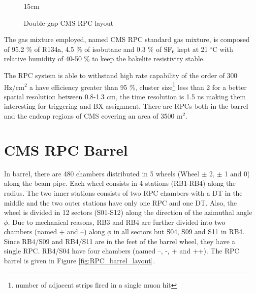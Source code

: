 \begin{figure}[!htm]{15cm} %
\caption{Double-gap CMS RPC layout}%
\label{fig:RPClayout}
\end{figure}

The gas mixture employed, named CMS RPC standard gas mixture, is composed of 95.2 \% of R134a, 4.5 \% of isobutane and 0.3 \% of SF$_6$ kept at 21 $^\circ$C with relative humidity of 40-50 \% to keep the bakelite resistivity stable. 

The RPC system is able to withstand high rate capability of the order of 300 Hz/cm$^2$ a have efficiency greater than 95 \%, cluster size\footnote{number of adjacent strips fired in a single muon hit} less than 2 for a better spatial resolution between 0.8-1.3 cm, the time resolution is 1.5 ns making them interesting for triggering and BX assignment. There are RPCs both in the barrel and the endcap regions of CMS covering an area of 3500 m$^2$. 

\section{CMS RPC Barrel}

In barrel, there are 480 chambers distributed in 5 wheels (Wheel $\pm$ 2, $\pm$ 1 and 0) along the beam pipe. Each wheel consists in 4 stations (RB1-RB4) along the radius. The two inner stations consists of two RPC chambers with a DT in the middle and the two outer stations have only one RPC and one DT. Also, the wheel is divided in 12 sectors (S01-S12) along the direction of the azimuthal angle $\phi$. Due to mechanical reasons, RB3 and RB4 are further divided into two chambers (named + and –) along $\phi$ in all sectors but S04, S09 and S11 in RB4. Since RB4/S09 and RB4/S11 are in the feet of the barrel wheel, they have a single RPC. RB4/S04 have four chambers (named --, -, + and ++). The RPC barrel is given in Figure \ref{fig:RPC_barrel_layout}.

